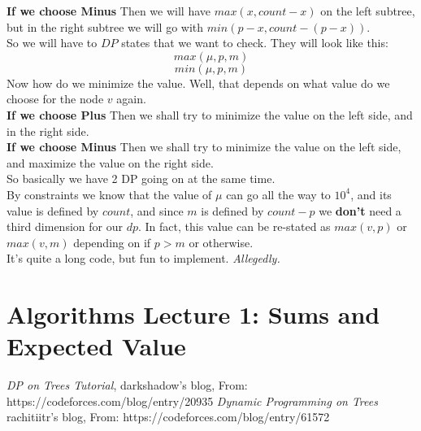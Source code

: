 \documentclass{IEEEtran}
\begin{document}
            \textbf{If we choose Minus} Then we will have $max(x, count-x)$ on the left subtree, but in the right subtree we will go with $min(p-x, count-(p-x))$.\\
            So we will have to $DP$ states that we want to check. They will look like this:
            $$max(\mu,p,m)$$
            $$min(\mu,p,m)$$
            Now how do we minimize the value. Well, that depends on what value do we choose for the node $v$ again.\\
            \textbf{If we choose Plus} Then we shall try to minimize the value on the left side, and in the right side.\\
            \textbf{If we choose Minus} Then we shall try to minimize the value on the left side, and maximize the value on the right side.\\
            So basically we have 2 DP going on at the same time.\\
            By constraints we know that the value of $\mu$ can go all the way to $10^4$, and its value is defined by $count$, and since $m$ is defined by $count-p$ we \textbf{don't} need a third dimension for our $dp$. In fact, this value can be re-stated as $max(v,p)$ or $max(v,m)$ depending on if $p>m$ or otherwise.\\
            It's quite a long code, but fun to implement. \textit{Allegedly.}

    \section{Algorithms Lecture 1: Sums and Expected Value}

    \begin{thebibliography}{}
            \textit{DP on Trees Tutorial},
            darkshadow's blog,
            From: https://codeforces.com/blog/entry/20935
            \textit{Dynamic Programming on Trees}
            rachitiitr's blog,
            From: https://codeforces.com/blog/entry/61572
    \end{thebibliography}
\end{document}
